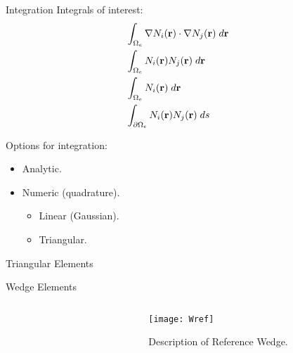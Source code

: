 \begin{frame}{Integration}
  Integrals of interest:
  \begin{align}
    &\int_{\Omega_e} \mathbf{\nabla} N_i(\mathbf{r}) \cdot \mathbf{\nabla} N_j(\mathbf{r}) 
      \;d\mathbf{r} \\
    &\int_{\Omega_e} N_i(\mathbf{r}) N_j(\mathbf{r}) \;d\mathbf{r} \\
    &\int_{\Omega_e} N_i(\mathbf{r}) \;d\mathbf{r} \\
    &\int_{\partial \Omega_e} N_i(\mathbf{r}) N_j(\mathbf{r}) \;ds &
  \end{align}

  Options for integration:
  \begin{itemize}
    \item Analytic.
    \item Numeric (quadrature).
    \begin{itemize}
      \item Linear (Gaussian).
      \item Triangular.
    \end{itemize}
  \end{itemize}
\end{frame}

\begin{frame}{Triangular Elements}
  \begin{figure}
    \centering
    \vspace{0.2in}
    \label{fig:triangle_elements}
  \end{figure}
\end{frame}

\begin{frame}{Wedge Elements}
  \begin{columns}
    \begin{column}{0.5\textwidth}
      \begin{figure}
        \centering
        \hspace{0.1\textwidth}
        \label{fig:sketch_wedge}
      \end{figure}
    \end{column}
    \begin{column}{0.5\textwidth}
      \vspace*{\fill}
      \begin{figure}
        \centering
        \texttt{[image: Wref]}
        \caption{Description of Reference Wedge.}
        \label{fig:Wref}
      \end{figure}
      \vspace*{\fill}
    \end{column}
  \end{columns}
\end{frame}

